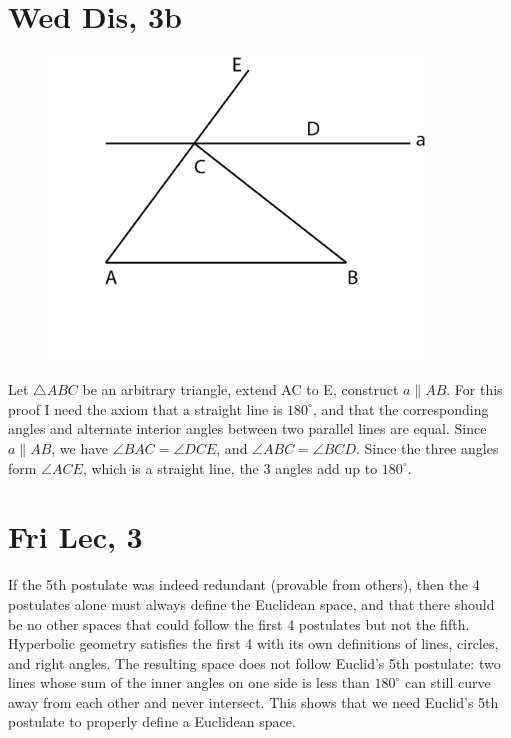 \documentclass[12pt]{article}
\newcommand{\degrees}{^{\circ}}
\begin{document}
\section{Wed Dis, 3b}
\begin{figure}[h]
    \includegraphics[width = 100mm]{GRAPH6.png}
\end{figure}
Let $\triangle ABC$ be an arbitrary triangle, extend AC to E, construct $a \parallel AB$.
\newline
For this proof I need the axiom that a straight line is $180 \degrees$, and that the corresponding angles and alternate interior angles between two parallel lines are equal.
\newline
Since $a \parallel AB$, we have $\angle BAC = \angle DCE$, and $\angle ABC = \angle BCD$. Since the three angles form $\angle ACE$, which is a straight line, the 3 angles add up to $180 \degrees$.
\newpage


\section{Fri Lec, 3}
If the 5th postulate was indeed redundant (provable from others), then the 4 postulates alone must always define the Euclidean space, and that there should be no other spaces that could follow the first 4 postulates but not the fifth.
\newline
Hyperbolic geometry satisfies the first 4 with its own definitions of lines, circles, and right angles. The resulting space does not follow Euclid's 5th postulate: two lines whose sum of the inner angles on one side is less than $180 \degrees$ can still curve away from each other and never intersect.
\newline
This shows that we need Euclid's 5th postulate to properly define a Euclidean space.
\newpage
\end{document}
